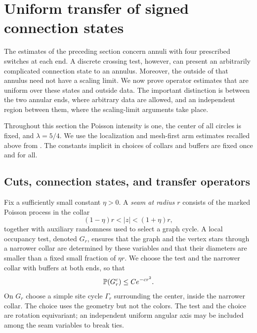 \section{Uniform transfer of signed connection states}
\label{tr:section}
\label{sec:transfer}

The estimates of the preceding section concern annuli with four prescribed
switches at each end.  A discrete crossing test, however, can present an
arbitrarily complicated connection state to an annulus.  Moreover, the
outside of that annulus need not have a scaling limit.  We now prove
operator estimates that are uniform over these states and outside data.
The important distinction is between the two annular ends, where arbitrary
data are allowed, and an independent region between them, where the
scaling-limit arguments take place.

Throughout this section the Poisson intensity is one, the center of all
circles is fixed, and $\lambda=5/4$.  We use the localization and mesh-first
arm estimates recalled above from \cite[Sections~2--3]{V}.  The constants
implicit in choices of collars and buffers are fixed once and for all.

\subsection{Cuts, connection states, and transfer operators}

Fix a sufficiently small constant $\eta>0$.  A \emph{seam at radius $r$}
consists of the marked Poisson process in the collar
\[
             (1-\eta)r<|z|<(1+\eta)r,
\]
together with auxiliary randomness used to select a graph cycle.  A
local occupancy test, denoted $G_r$, ensures that the graph and the vertex
stars through a narrower collar are determined by these variables and
that their diameters are smaller than a fixed small fraction of $\eta r$.
We choose the test and the narrower collar with buffers at both ends, so
that
\begin{equation}
                    \mathbb P(G_r^c)\le C e^{-cr^2}.
\label{tr:screen}
\end{equation}
On $G_r$ choose a simple site cycle $\Gamma_r$ surrounding the center,
inside the narrower collar.  The choice uses the geometry but not the
colors.  The test and the choice are rotation equivariant; an independent
uniform angular axis may be included among the seam variables to break
ties.

